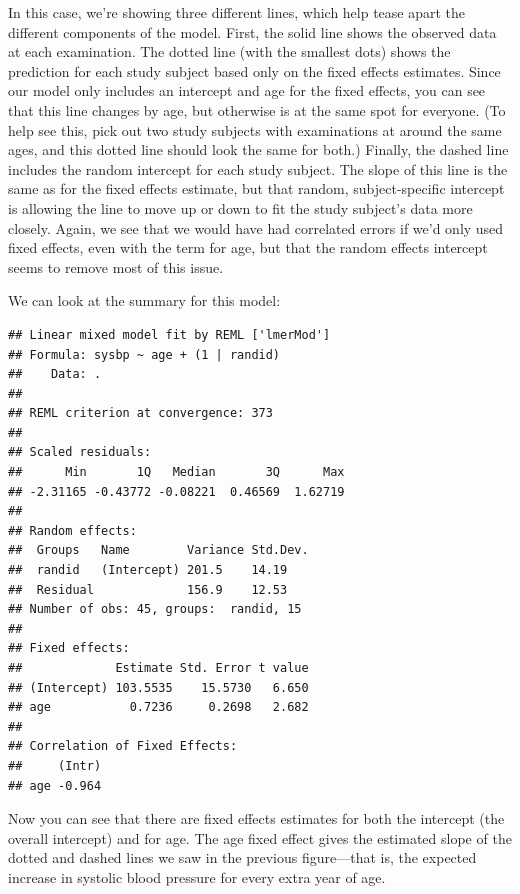 \documentclass[
]{book}
\newenvironment{Shaded}{\begin{snugshade}}{\end{snugshade}}
\newcommand{\KeywordTok}[1]{\textcolor[rgb]{0.13,0.29,0.53}{\textbf{#1}}}
\newcommand{\NormalTok}[1]{#1}
\newcommand{\OperatorTok}[1]{\textcolor[rgb]{0.81,0.36,0.00}{\textbf{#1}}}
\newcommand{\StringTok}[1]{\textcolor[rgb]{0.31,0.60,0.02}{#1}}
\begin{document}
In this case, we're showing three different lines, which help tease apart the
different components of the model. First, the solid line shows the observed data
at each examination. The dotted line (with the smallest dots) shows the
prediction for each study subject based only on the fixed effects estimates.
Since our model only includes an intercept and age for the fixed effects, you
can see that this line changes by age, but otherwise is at the same spot for
everyone. (To help see this, pick out two study subjects with examinations at
around the same ages, and this dotted line should look the same for both.)
Finally, the dashed line includes the random intercept for each study subject.
The slope of this line is the same as for the fixed effects estimate, but that
random, subject-specific intercept is allowing the line to move up or down to
fit the study subject's data more closely. Again, we see that we would have
had correlated errors if we'd only used fixed effects, even with the term for
age, but that the random effects intercept seems to remove most of this issue.

We can look at the summary for this model:

\begin{Shaded}
\end{Shaded}

\begin{verbatim}
## Linear mixed model fit by REML ['lmerMod']
## Formula: sysbp ~ age + (1 | randid)
##    Data: .
## 
## REML criterion at convergence: 373
## 
## Scaled residuals: 
##      Min       1Q   Median       3Q      Max 
## -2.31165 -0.43772 -0.08221  0.46569  1.62719 
## 
## Random effects:
##  Groups   Name        Variance Std.Dev.
##  randid   (Intercept) 201.5    14.19   
##  Residual             156.9    12.53   
## Number of obs: 45, groups:  randid, 15
## 
## Fixed effects:
##             Estimate Std. Error t value
## (Intercept) 103.5535    15.5730   6.650
## age           0.7236     0.2698   2.682
## 
## Correlation of Fixed Effects:
##     (Intr)
## age -0.964
\end{verbatim}

Now you can see that there are fixed effects estimates for both the intercept
(the overall intercept) and for age. The age fixed effect gives the estimated
slope of the dotted and dashed lines we saw in the previous figure---that is,
the expected increase in systolic blood pressure for every extra year of age.
\end{document}

